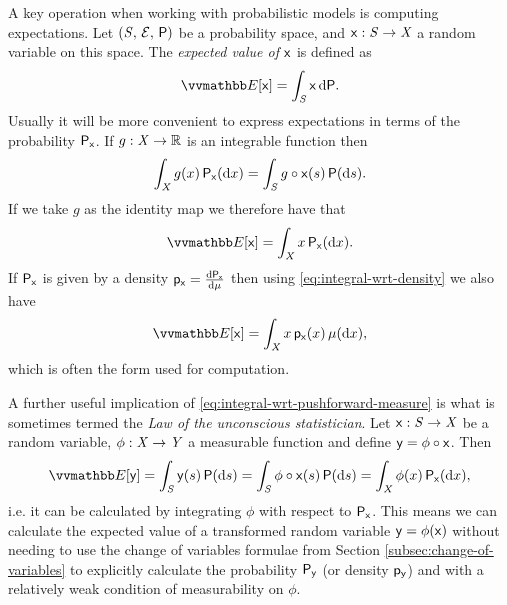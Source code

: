 A key operation when working with probabilistic models is computing expectations. Let $(\mathit{S},\,\mathcal{E},\,\mathsf{P})$ be a probability space, and $\mathsf{x} : \mathit{S} \to \mathit{X}$ a random variable on this space. The \emph{expected value of $\mathsf{x}$} is defined as
\begin{equation}\label{eq:expectation-general}
  \expc{\rvar{x}} = \int_{\set{S}} \rvar{x}\,\dr\probability.
\end{equation}
Usually it will be more convenient to express expectations in terms of the probability $\mathsf{P}_{\mathsf{x}}$. If $g : \mathit{X} \to \mathbb{R}$ is an integrable function then
\begin{equation}\label{eq:integral-wrt-pushforward-measure}
  \int_{\mathit{X}} g(x) \,\mathsf{P}_{\mathsf{x}}(\mathrm{d} x) =
  \int_{\mathit{S}} g \circ \mathsf{x}(s) \,\mathsf{P}(\mathrm{d} s).
\end{equation}
If we take $g$ as the identity map we therefore have that
\begin{equation}\label{eq:expectation-pushfoward}
  \expc{\rvar{x}} = \int_{\set{X}} x \,\prob{\rvar{x}}(\dr x).
\end{equation}
If $\mathsf{P}_{\mathsf{x}}$ is given by a density $\mathsf{p}_{\mathsf{x}} = \frac{\mathrm{d} \mathsf{P}_{\mathsf{x}}}{\mathrm{d} \mu}$ then using \eqref{eq:integral-wrt-density} we also have
\begin{equation}\label{eq:expectation-density}
  \expc{\rvar{x}} = \int_{\set{X}} x \,\pden{\rvar{x}}(x) \,\mu(\dr x),
\end{equation}
which is often the form used for computation.

A further useful implication of \eqref{eq:integral-wrt-pushforward-measure} is what is sometimes termed the \emph{Law of the unconscious statistician}. Let $\mathsf{x} : \mathit{S} \to \mathit{X}$ be a random variable, $\phi : \mathit{X} \to \mathit{Y}$ a measurable function and define $\mathsf{y} = \phi \circ \mathsf{x}$. Then %
\begin{equation}\label{eq:law-of-the-unconscious-statistician}
  \expc{\rvar{y}} = \int_{\set{S}} \rvar{y}(s) \,\probability(\dr s)
  = \int_{\set{S}} \phi \circ \rvar{x}(s) \,\probability(\dr s)
  = \int_{\set{X}} \phi(x) \,\prob{\rvar{x}}(\dr x),
\end{equation}
i.e. it can be calculated by integrating $\phi$ with respect to $\mathsf{P}_{\mathsf{x}}$. This means we can calculate the expected value of a transformed random variable $\mathsf{y} = \phi(\mathsf{x})$ without needing to use the change of variables formulae from Section \ref{subsec:change-of-variables} to explicitly calculate the probability $\mathsf{P}_{\mathsf{y}}$ (or density $\mathsf{p}_{\mathsf{y}}$) and with a relatively weak condition of measurability on $\phi$.

